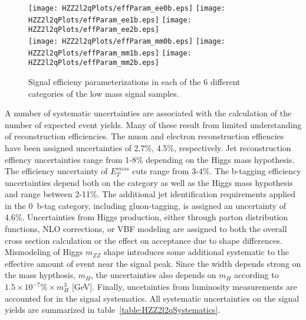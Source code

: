\begin{figure}
\begin{center}
\texttt{[image: HZZ2l2qPlots/effParam\_ee0b.eps]}
\texttt{[image: HZZ2l2qPlots/effParam\_ee1b.eps]}
\texttt{[image: HZZ2l2qPlots/effParam\_ee2b.eps]}\\
\texttt{[image: HZZ2l2qPlots/effParam\_mm0b.eps]}
\texttt{[image: HZZ2l2qPlots/effParam\_mm1b.eps]}
\texttt{[image: HZZ2l2qPlots/effParam\_mm2b.eps]}

\caption{Signal efficieny parameterizations in each of the 6
different categories of the low mass signal samples.}
\label{fig:efficiencyLowMass}
\end{center}
\end{figure}

A number of systematic uncertainties are associated with the calculation
of the number of expected event yields.  Many of these result from
limited understanding of reconstruction efficiencies.  The 
muon and electron reconstruction effiencies have been assigned 
uncertainties of 2.7\%, 4.5\%, respectively.  Jet reconstruction
effiency uncertainties range from 1-8\% depending on the Higgs mass
hypothesis.  The efficiency uncertainty of $E_T^{miss}$ cuts range from
3-4\%.  The b-tagging efficiency uncertainties depend both on the 
category as well as the Higgs mass hypothesis and range between 2-11\%. 
The additional jet identification requirements applied in the 0~b-tag
category, including gluon-tagging, is assigned an uncertainty of 4.6\%.
Uncertainties from Higgs production, either through parton distribution
functions, NLO corrections, or VBF modeling are assigned to both the
overall cross section calculation or the effect on acceptance due to
shape differences.  Mismodeling of Higgs $m_{ZZ}$ shape introduces some
additional systematic to the effective amount of event near the signal
peak.  Since the width depends strong on the mass hypthosis, $m_H$, the
uncertainties also depends on $m_H$ according to 
$1.5\times10^{-7}\%\times m_H^3$ [GeV].  Finally, uncetainties from 
luminosity measurements are accounted for in the signal systematics. 
All systematic uncertainties on the signal yields are summarized in 
table~\ref{table:HZZ2l2qSystematics}.

